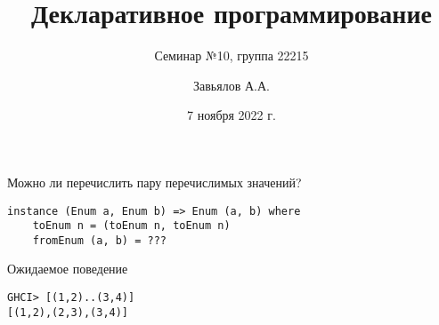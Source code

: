 \documentclass{beamer}
\title{Декларативное программирование}
\subtitle{Семинар №10, группа 22215}
\author{Завьялов А.А.}
\date{7 ноября 2022 г.}
\institute{Кафедра систем информатики ФИТ НГУ}
\begin{document}
  \maketitle
  \begin{frame}[fragile]{Можно ли перечислить пару перечислимых значений?}
      \begin{verbatim}
instance (Enum a, Enum b) => Enum (a, b) where
    toEnum n = (toEnum n, toEnum n)
    fromEnum (a, b) = ???
      \end{verbatim}
      \begin{block}{Ожидаемое поведение}
      \begin{verbatim}
GHCI> [(1,2)..(3,4)]
[(1,2),(2,3),(3,4)]
      \end{verbatim}
      \end{block}
  \end{frame}
\end{document}
